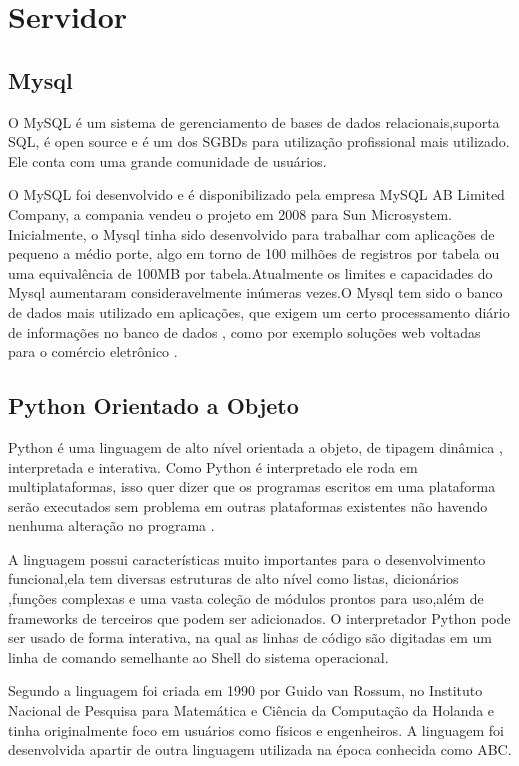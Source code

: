 \documentclass[openright]{ifrs} %
\begin{document}
\section{Servidor}



\subsection{Mysql}

O MySQL é um sistema de gerenciamento de bases de dados relacionais,suporta SQL, é open source e é um dos SGBDs para utilização profissional mais utilizado. Ele conta com uma grande comunidade de usuários.

O MySQL foi desenvolvido e é disponibilizado pela empresa MySQL AB Limited Company, a compania vendeu o projeto em 2008 para Sun Microsystem. Inicialmente, o Mysql tinha sido desenvolvido
para trabalhar com aplicações de pequeno a médio porte, algo em torno de  100 milhões de registros por tabela ou uma equivalência de 100MB por tabela.Atualmente os limites e capacidades do Mysql aumentaram consideravelmente inúmeras vezes.O Mysql tem sido o banco de dados mais utilizado em aplicações, que exigem um certo processamento diário de informações no banco de dados , como por exemplo soluções web voltadas para  o comércio eletrônico \cite{milani2007mysql}.
 
 


\subsection{Python Orientado a Objeto}
Python é  uma linguagem de alto nível orientada a objeto, de tipagem dinâmica , interpretada e
interativa. Como Python é interpretado ele roda em multiplataformas, isso quer dizer que os programas escritos em uma plataforma serão
executados sem problema em outras plataformas existentes não havendo nenhuma alteração no programa  \cite{borges2014python}. 

A linguagem possui características muito importantes para o desenvolvimento funcional,ela tem diversas estruturas de alto nível  como listas, dicionários ,funções complexas e uma vasta coleção de módulos prontos para uso,além de frameworks de terceiros que podem ser adicionados. O interpretador Python pode ser usado de forma interativa, na qual as linhas de código são digitadas em um linha de comando semelhante ao Shell do sistema operacional.

Segundo \cite{borges2014python} a linguagem foi criada em 1990 por Guido van Rossum, no Instituto Nacional de Pesquisa para Matemática e Ciência da Computação da Holanda
e tinha originalmente foco em usuários como físicos e engenheiros. A linguagem foi desenvolvida apartir de outra linguagem utilizada na época conhecida como ABC. 
\end{document}

